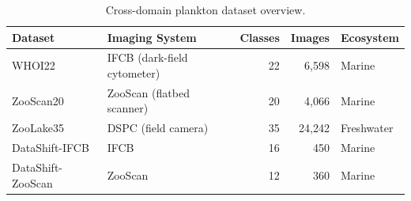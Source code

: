 \begin{table}[t]
\centering
\caption{Cross-domain plankton dataset overview.}
\label{tab:datasets}
\begin{tabular}{llrrl}
\toprule
\textbf{Dataset} & \textbf{Imaging System} & \textbf{Classes} & \textbf{Images} & \textbf{Ecosystem} \\
\midrule
WHOI22 & IFCB (dark-field cytometer) & 22 & 6,598 & Marine \\
ZooScan20 & ZooScan (flatbed scanner) & 20 & 4,066 & Marine \\
ZooLake35 & DSPC (field camera) & 35 & 24,242 & Freshwater \\
DataShift-IFCB & IFCB & 16 & 450 & Marine \\
DataShift-ZooScan & ZooScan & 12 & 360 & Marine \\
\bottomrule
\end{tabular}
\end{table}
